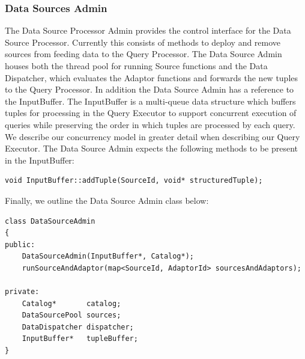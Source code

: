 \documentclass[14pt]{article}
\newcommand{\comment}[1]{}
\begin{document}
\subsubsection{Data Sources Admin}

The Data Source Processor Admin provides the control interface for the Data
Source Processor. Currently this consists of methods to deploy and remove
sources from feeding data to the Query Processor. The Data Source Admin houses
both the thread pool for running Source functions and the Data Dispatcher, which
evaluates the Adaptor functions and forwards the new tuples to the Query
Processor.
In addition the Data Source Admin has a reference to the InputBuffer.
The InputBuffer is a multi-queue data structure which buffers tuples for
processing in the Query Executor to support concurrent execution of queries
while preserving the order in which tuples are processed by each query. We
describe our concurrency model in greater detail when describing our Query
Executor. The Data Source Admin expects the following methods to be present in
the InputBuffer:

\begin{Verbatim}
void InputBuffer::addTuple(SourceId, void* structuredTuple);
\end{Verbatim}

\comment{
Data Sources Admin provides an interface for adding new Data Sources. Each Data
Source is paired up with a Data Adaptor. The later converts raw data tuples to
format understood by query.

Another reason for Data Sources Admin is to provide a level of abstraction since
calls for Data Source and Data Adaptor additions will be executed in the
compiler execution path.
}

\noindent Finally, we outline the Data Source Admin class below:

\begin{Verbatim}
class DataSourceAdmin
{
public:
    DataSourceAdmin(InputBuffer*, Catalog*);
    runSourceAndAdaptor(map<SourceId, AdaptorId> sourcesAndAdaptors);

private:
    Catalog*       catalog;
    DataSourcePool sources;
    DataDispatcher dispatcher;
    InputBuffer*   tupleBuffer;
}
\end{Verbatim}

\comment{
\noindent Data Source Admin is also responsible for handling Data Dispatcher and
Data Sources Manager.
}
\end{document}
